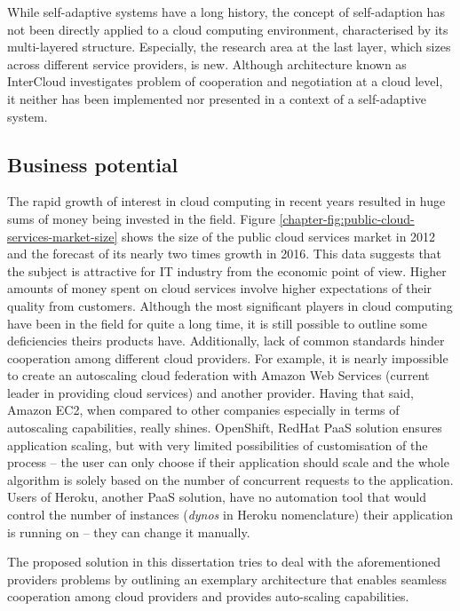 While self-adaptive systems have a long history, the concept of self-adaption has not been directly applied to a cloud computing environment, characterised by its multi-layered structure. Especially, the research area at the last layer, which sizes across different service providers, is new. Although architecture known as InterCloud \cite{BuRaCa10} investigates problem of cooperation and negotiation at a cloud level, it neither has been implemented nor presented in a context of a self-adaptive system.

\subsection*{Business potential}
The rapid growth of interest in cloud computing in recent years resulted in huge sums of money being invested in the field. Figure \ref{chapter-fig:public-cloud-services-market-size} shows the size of the public cloud services market in 2012 and the forecast of its nearly two times growth in 2016. This data suggests that the subject is attractive for IT industry from the economic point of view. Higher amounts of money spent on cloud services involve higher expectations of their quality from customers. Although the most significant players in cloud computing have been in the field for quite a long time, it is still possible to outline some deficiencies theirs products have. Additionally, lack of common standards hinder cooperation among different cloud providers. For example, it is nearly impossible to create an autoscaling cloud federation with Amazon Web Services (current leader in providing cloud services\cite{GartnerMagicQuadrantSep2013}) and another provider. Having that said, Amazon EC2, when compared to other companies especially in terms of autoscaling capabilities, really shines. OpenShift, RedHat PaaS solution ensures application scaling, but with very limited possibilities of customisation of the process -- the user can only choose if their application should scale and the whole algorithm is solely based on the number of concurrent requests to the application. Users of Heroku, another PaaS solution, have no automation tool that would control the number of instances (\emph{dynos} in Heroku nomenclature) their application is running on -- they can change it manually.

The proposed solution in this dissertation tries to deal with the aforementioned providers problems by outlining an exemplary architecture that enables seamless cooperation among cloud providers and provides auto-scaling capabilities.

